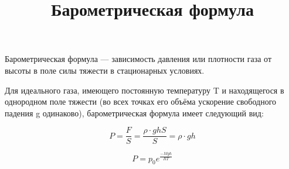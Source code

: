 \documentclass[12pt]{article}
\title{\bf Барометрическая формула}
\begin{document}
 
\maketitle 
Барометрическая формула — зависимость давления или плотности газа от высоты в поле силы тяжести в стационарных условиях.

Для идеального газа, имеющего постоянную температуру T и находящегося в однородном поле тяжести (во всех точках его объёма ускорение свободного падения g одинаково), барометрическая формула имеет следующий вид:
\newline 
\begin{k} 

$$ P = \frac FS = \frac {\rho\cdot ghS}{S} =\rho\cdot gh $$

\newline 

$$ P = p_0e^ \frac {-Mgh}{RT} $$

\end{k}
\end{document}
